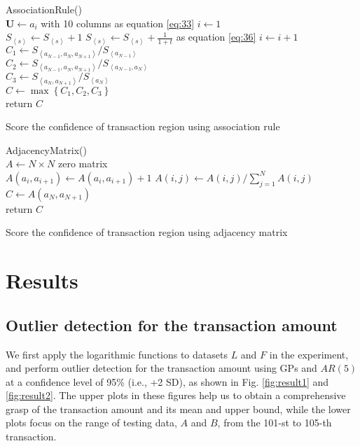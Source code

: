 \documentclass[final,authoryear,5p,times,twocolumn]{elsarticle}
\begin{document}
\begin{algorithm}[h!]
AssociationRule() \\
{
$\mathbf{U} \leftarrow a_i$ with 10 columns as equation \eqref{eq:33}
}
{
	$i \gets 1$ \\
	{
			{
				$S_{\left \langle s \right \rangle}\gets S_{\left \langle s \right \rangle}+1$
			}
			{
			$S_{\left \langle s \right \rangle}\gets S_{\left \langle s \right \rangle}+\frac{1}{1+t}$	as equation \eqref{eq:36}
			}
	$i \gets i+1$
	}
}
$C_1 \gets S_{\left \langle a_{N-1}, a_N, a_{N+1} \right \rangle}/S_{\left \langle a_{N-1} \right \rangle}$ \\
$C_2 \gets S_{\left \langle a_{N-1}, a_N, a_{N+1} \right \rangle}/S_{\left \langle a_{N-1}, a_N \right \rangle}$ \\
$C_3 \gets S_{\left \langle a_N, a_{N+1} \right \rangle}/S_{\left \langle a_N \right \rangle}$ \\
$C \gets \max \left \{ C_1,C_2,C_3 \right \}$ \\
return $C$
\caption{Score the confidence of transaction region using association rule}
\end{algorithm}
\begin{algorithm}[h]
AdjacencyMatrix() \\
$A \gets N\times N$ zero matrix \\
{
	$A(a_i,a_{i+1})\gets A(a_i,a_{i+1})+1$
}
{
	$A(i,j) \gets A(i,j)/\sum_{j=1}^{N}A(i,j)$
}
$C \gets A(a_N, a_{N+1})$ \\
return $C$
\caption{Score the confidence of transaction region using adjacency matrix}
\end{algorithm}

\section{Results}
\label{section:Sec5}


\subsection{Outlier detection for the transaction amount}

We first apply the logarithmic functions to datasets $L$ and $F$ in the experiment, and perform outlier detection for the transaction amount using GPs and $AR(5)$ at a confidence level of 95\% (i.e., +2 SD), as shown in Fig. \ref{fig:result1} and \ref{fig:result2}. The upper plots in these figures help us to obtain a comprehensive grasp of the transaction amount and its mean and upper bound, while the lower plots focus on the range of testing data, $A$ and $B$, from the 101-st to 105-th transaction.
\end{document}
